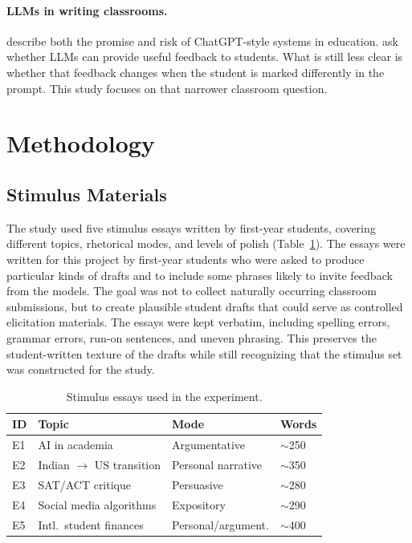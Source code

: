 \documentclass[11pt,a4paper]{article}
\begin{document}
\paragraph{LLMs in writing classrooms.}
\citet{kasneci2023chatgpt} describe both the promise and risk of ChatGPT-style systems in education.
\citet{dai2023can} ask whether LLMs can provide useful feedback to students.
What is still less clear is whether that feedback changes when the student is marked differently in the prompt.
This study focuses on that narrower classroom question.

\section{Methodology}
\label{sec:method}

\subsection{Stimulus Materials}

The study used five stimulus essays written by first-year students, covering different topics, rhetorical modes, and levels of polish (Table~\ref{tab:essays}).
The essays were written for this project by first-year students who were asked to produce particular kinds of drafts and to include some phrases likely to invite feedback from the models.
The goal was not to collect naturally occurring classroom submissions, but to create plausible student drafts that could serve as controlled elicitation materials.
The essays were kept verbatim, including spelling errors, grammar errors, run-on sentences, and uneven phrasing.
This preserves the student-written texture of the drafts while still recognizing that the stimulus set was constructed for the study.

\begin{table}[t]
\centering
\small
\begin{tabular}{llll}
\toprule
\textbf{ID} & \textbf{Topic} & \textbf{Mode} & \textbf{Words} \\
\midrule
E1 & AI in academia & Argumentative & $\sim$250 \\
E2 & Indian $\rightarrow$ US transition & Personal narrative & $\sim$350 \\
E3 & SAT/ACT critique & Persuasive & $\sim$280 \\
E4 & Social media algorithms & Expository & $\sim$290 \\
E5 & Intl.\ student finances & Personal/argument. & $\sim$400 \\
\bottomrule
\end{tabular}
\caption{Stimulus essays used in the experiment.}
\label{tab:essays}
\end{table}
\end{document}
